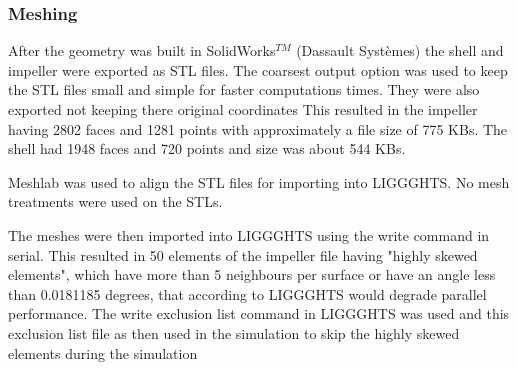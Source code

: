 \documentclass[preprint,11pt,authoryear]{elsarticle}
\begin{document}
\subsubsection{Meshing}
\par After the geometry was built in SolidWorks$^{TM}$ (Dassault Syst\`{e}mes) the shell and impeller were exported as STL files. The coarsest output option was used to keep the STL files small and simple for faster computations times. They were also exported not keeping there original coordinates  This resulted in the impeller having 2802 faces and 1281 points with approximately a file size of 775 KBs. The shell had 1948 faces and 720 points and size was about 544 KBs.  
\par Meshlab was used to align the STL files for importing into LIGGGHTS. No mesh treatments were used on the STLs. 
\par The meshes were then imported into LIGGGHTS using the write command in serial. This resulted in 50 elements of the impeller file having "highly skewed elements", which have more than 5 neighbours per surface or have an angle less than 0.0181185 degrees, that according to LIGGGHTS would degrade parallel performance. The write exclusion list command in LIGGGHTS was used and this exclusion list file as then used in the simulation to skip the highly skewed elements during the simulation 
\end{document}
